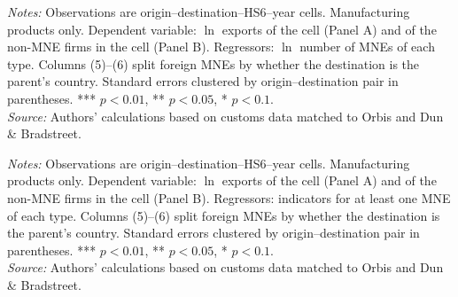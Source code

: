 \documentclass[11pt,a4paper]{article}
\begin{document}
\begin{table}[H]\centering\small%
  \caption{Manufacturing: Multinational Presence and Exports: Intensive Margin, by Type of Multinational}%
  \label{tab:cnt_manufacturing}%
  \par\vspace{3pt}%
  \begin{minipage}{0.95\textwidth}\footnotesize %
  \textit{Notes:} Observations are origin--destination--HS6--year cells. Manufacturing products only. Dependent variable: $\ln$ exports of the cell (Panel A) and of the non-MNE firms in the cell (Panel B). Regressors: $\ln$ number of MNEs of each type. Columns (5)--(6) split foreign MNEs by whether the destination is the parent's country. Standard errors clustered by origin--destination pair in parentheses. *** $p<0.01$, ** $p<0.05$, * $p<0.1$.\\[3pt]%
  \textit{Source:} Authors' calculations based on customs data matched to Orbis and Dun \& Bradstreet.%
  \end{minipage}%
  \end{table}
\begin{table}[H]\centering\small%
  \caption{Manufacturing: Multinational Presence and Exports: Extensive Margin, by Type of Multinational}%
  \label{tab:ext_manufacturing}%
  \par\vspace{3pt}%
  \begin{minipage}{0.95\textwidth}\footnotesize %
  \textit{Notes:} Observations are origin--destination--HS6--year cells. Manufacturing products only. Dependent variable: $\ln$ exports of the cell (Panel A) and of the non-MNE firms in the cell (Panel B). Regressors: indicators for at least one MNE of each type. Columns (5)--(6) split foreign MNEs by whether the destination is the parent's country. Standard errors clustered by origin--destination pair in parentheses. *** $p<0.01$, ** $p<0.05$, * $p<0.1$.\\[3pt]%
  \textit{Source:} Authors' calculations based on customs data matched to Orbis and Dun \& Bradstreet.%
  \end{minipage}%
  \end{table}
\end{document}
